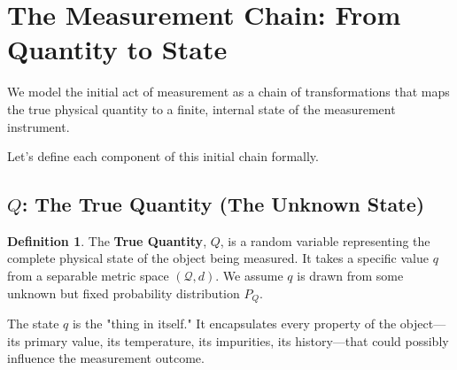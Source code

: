 \documentclass[12pt]{article}
\theoremstyle{definition}
\newtheorem{definition}{Definition}[section]
\begin{document}
\section{The Measurement Chain: From Quantity to State}

We model the initial act of measurement as a chain of transformations that maps the true physical quantity to a finite, internal state of the measurement instrument.

\begin{center}
\end{center}

Let's define each component of this initial chain formally.

\subsection{$Q$: The True Quantity (The Unknown State)}
\begin{definition}
The \textbf{True Quantity}, $Q$, is a random variable representing the complete physical state of the object being measured. It takes a specific value $q$ from a separable metric space $(\mathcal{Q}, d)$. We assume $q$ is drawn from some unknown but fixed probability distribution $P_Q$.
\end{definition}
The state $q$ is the "thing in itself." It encapsulates every property of the object—its primary value, its temperature, its impurities, its history—that could possibly influence the measurement outcome.
\end{document}
